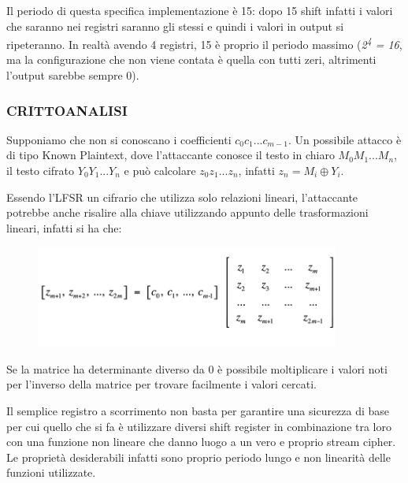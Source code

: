 Il periodo di questa specifica implementazione è 15: dopo 15 shift infatti i valori che saranno nei registri saranno gli stessi e quindi i valori in output si ripeteranno. In realtà avendo 4 registri, 15 è proprio il periodo massimo (\textit{2\textsuperscript{4} = 16}, ma la configurazione che non viene contata è quella con tutti zeri, altrimenti l'output sarebbe sempre 0). 

\subsubsection{\textbf{CRITTOANALISI}}
Supponiamo che non si conoscano i coefficienti $c_{0} c_{1} ... c_{m-1}$. Un possibile attacco è di tipo Known Plaintext, dove l'attaccante conosce il testo in chiaro $M_{0} M_{1} ... M_{n}$, il testo cifrato $Y_{0} Y_{1} ... Y_{n}$ e può calcolare $z_{0} z_{1} ... z_{n}$, infatti $z_{n} = M_{i} \oplus Y_{i}$.

Essendo l'LFSR un cifrario che utilizza solo relazioni lineari, l'attaccante potrebbe anche risalire alla chiave utilizzando appunto delle trasformazioni lineari, infatti si ha che:

\begin{figure}[htb!]
    \centering
    \includegraphics[width=10cm]{./Images/cap1/1.33.png}
\end{figure} 

Se la matrice ha determinante diverso da 0 è possibile moltiplicare i valori noti per l'inverso della matrice per trovare facilmente i valori cercati.

Il semplice registro a scorrimento non basta per garantire una sicurezza di base per cui quello che si fa è utilizzare diversi shift register in combinazione tra loro con una funzione non lineare che danno luogo a un vero e proprio stream cipher. Le proprietà desiderabili infatti sono proprio periodo lungo e non linearità delle funzioni utilizzate.


